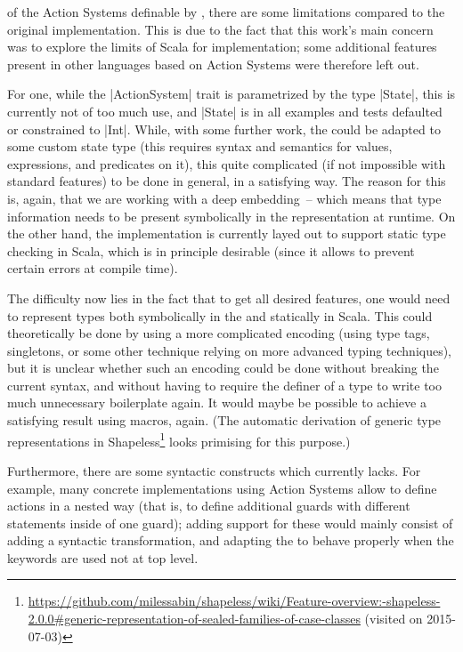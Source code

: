  of the Action Systems definable by \actium{}, there
are some limitations compared to the original implementation. This is due to the fact that this
work's main concern was to explore the limits of Scala for \dsl{} implementation; some additional
features present in other languages based on Action Systems were therefore left out.

For one, while the |ActionSystem| trait is parametrized by the type |State|, this is currently not
of too much use, and |State| is in all examples and tests defaulted or constrained to |Int|. While,
with some further work, the \dsl{} could be adapted to some custom state type (this requires syntax
and semantics for values, expressions, and predicates on it), this quite complicated (if not
impossible with standard features) to be done in general, in a satisfying way. The reason for this
is, again, that we are working with a deep embedding~-- which means that type information needs to
be present symbolically in the representation at runtime. On the other hand, the implementation is
currently layed out to support static type checking in Scala, which is in principle desirable (since
it allows to prevent certain errors at compile time).

The difficulty now lies in the fact that to get all desired features, one would need to represent
types both symbolically in the  and statically in Scala. This could theoretically be
done by using a more complicated encoding (using type tags, singletons, or some other technique
relying on more advanced typing techniques), but it is unclear whether such an encoding could be
done without breaking the current syntax, and without having to require the definer of a type to
write too much unnecessary boilerplate again. It would maybe be possible to achieve a satisfying
result using macros, again. (The automatic derivation of generic type representations in
Shapeless\footnote{\protect\url{https://github.com/milessabin/shapeless/wiki/Feature-overview:-shapeless-2.0.0\#generic-representation-of-sealed-families-of-case-classes}
  (visited on 2015-07-03)} looks primising for this purpose.)

Furthermore, there are some syntactic constructs which \actium{} currently lacks. For example, many
concrete implementations using Action Systems allow to define actions in a nested way (that is, to
define additional guards with different statements inside of one guard); adding support for these
would mainly consist of adding a syntactic transformation, and adapting the \dsl{} to behave
properly when the keywords are used not at top level.

